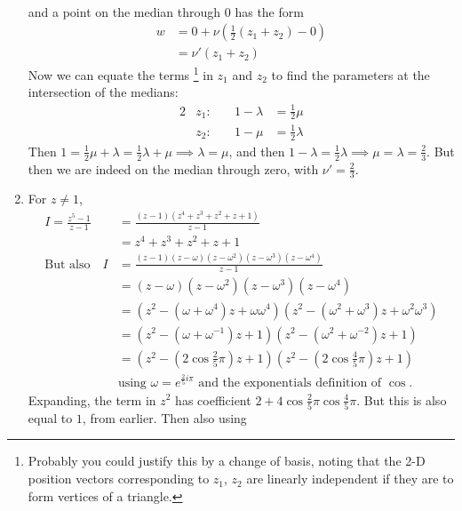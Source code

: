 \documentclass[fleqn,a4paper,11pt]{article}
\begin{document}
\begin{enumerate}
\begin{align*}
    \end{align*}
    and a point on the median through 0 has the form
    \begin{align*}
     w &= 0 + \nu (\tfrac 12 (z_1 + z_2) - 0) \\
       &= \nu' (z_1 + z_2)
    \end{align*}
    Now we can equate the terms
    \footnote{
     Probably you could justify this by a change of basis, noting that the 2-D
     position vectors corresponding to \(z_1\), \(z_2\) are linearly independent
     if they are to form vertices of a triangle.}
    in \(z_1\) and
    \(z_2\) to find the parameters at
    the intersection of the medians:
    \begin{alignat*}2
     &z_1\colon\quad& 1 - \lambda &= \tfrac 12 \mu \\
     &z_2\colon\quad& 1 - \mu &= \tfrac 12 \lambda
    \end{alignat*}
    Then
    \(1 = \frac 12 \mu + \lambda = \frac 12 \lambda + \mu \implies
      \lambda = \mu\), and then
    \(1 - \lambda = \frac 12 \lambda \implies
      \mu = \lambda = \frac 23\). But then we are indeed on the median through
    zero, with \(\nu' = \frac 23\).
   \item For \(z \ne 1\),
    \begin{align*}
     I = \frac{z^5 - 1}{z - 1}
       &= \frac{(z - 1)(z^4 + z^3 + z^2 + z + 1)}{z - 1} \\
       &= z^4 + z^3 + z^2 + z + 1 \\
     \text{But also}\quad
     I &= \frac{(z - 1)(z - \omega)
                (z - \omega^2)(z - \omega^3)(z - \omega^4)}{z - 1} \\
       &= (z - \omega)(z - \omega^2)(z - \omega^3)(z - \omega^4) \\
       &= (z^2 - (\omega + \omega^4)z + \omega \omega^4)
          (z^2 - (\omega^2 + \omega^3)z + \omega^2\omega^3) \\
       &= (z^2 - (\omega + \omega^{-1})z + 1)
          (z^2 - (\omega^2 + \omega^{-2})z + 1) \\
       &= (z^2 - (2 \cos \tfrac 25 \pi)z + 1)
          (z^2 - (2 \cos \tfrac 45 \pi)z + 1) \\
       &\text{using \(\omega = e^{\frac 25 i\pi}\) and the exponentials
              definition of \(\cos\).}
    \end{align*}
    Expanding, the term in \(z^2\) has coefficient
    \(2 + 4\cos \frac 25 \pi \cos \frac 45 \pi\). But this is also equal to
    \(1\), from earlier. Then also using

\end{enumerate}
\end{document}
